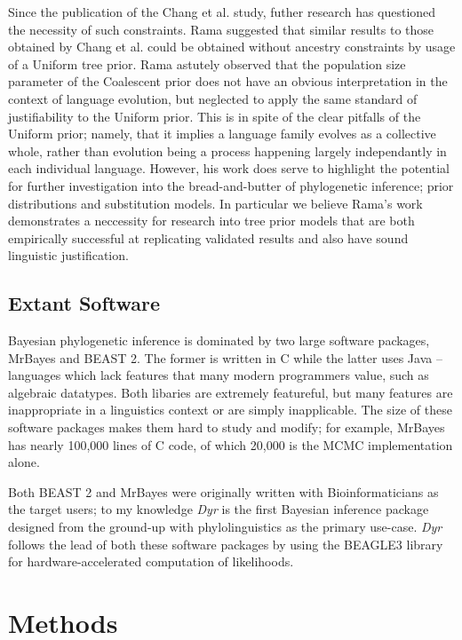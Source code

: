 \documentclass[10pt,journal,compsoc]{IEEEtran}
\begin{document}
Since the publication of the Chang et al. study, futher research has questioned the necessity of such constraints. Rama suggested that similar results to those obtained by Chang et al. could be obtained without ancestry constraints by usage of a Uniform tree prior.\cite{rama2018three} Rama astutely observed that the population size parameter of the Coalescent prior does not have an obvious interpretation in the context of language evolution, but neglected to apply the same standard of justifiability to the Uniform prior. This is in spite of the clear pitfalls of the Uniform prior; namely, that it implies a language family evolves as a collective whole, rather than evolution being a process happening largely independantly in each individual language. However, his work does serve to highlight the potential for further investigation into the bread-and-butter of phylogenetic inference; prior distributions and substitution models. In particular we believe Rama's work demonstrates a neccessity for research into tree prior models that are both empirically successful at replicating validated results and also have sound linguistic justification. 

\subsection{Extant Software}

Bayesian phylogenetic inference is dominated by two large software packages, MrBayes\cite{ronquist2012mrbayes} and BEAST 2\cite{bouckaert2014beast}. The former is written in C while the latter uses Java -- languages which lack features that many modern programmers value, such as algebraic datatypes. Both libaries are extremely featureful, but many features are inappropriate in a linguistics context or are simply inapplicable. The size of these software packages makes them hard to study and modify; for example, MrBayes has nearly 100,000 lines of C code, of which 20,000 is the MCMC implementation alone.

Both BEAST 2 and MrBayes were originally written with Bioinformaticians as the target users; to my knowledge \textit{Dyr} is the first Bayesian inference package designed from the ground-up with phylolinguistics as the primary use-case. \textit{Dyr} follows the lead of both these software packages by using the BEAGLE3 library for hardware-accelerated computation of likelihoods.\cite{ayres2019beagle}

\section{Methods}\label{sec:methods}
\end{document}
